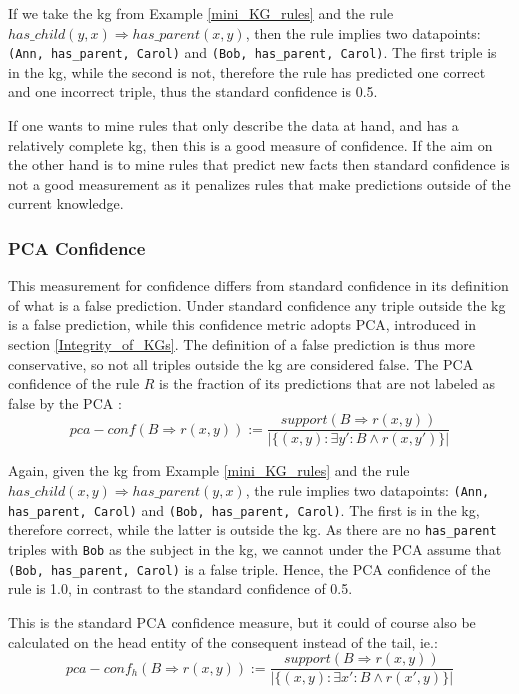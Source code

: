 If we take the \gls{kg} from Example \ref{mini_KG_rules} and the rule $has\_child(y, x) \Rightarrow has\_parent(x, y)$, then the rule implies two datapoints: \texttt{(Ann, has\_parent, Carol)} and \texttt{(Bob, has\_parent, Carol)}. The first triple is in the \gls{kg}, while the second is not, therefore the rule has predicted one correct and one incorrect triple, thus the standard confidence is 0.5.


If one wants to mine rules that only describe the data at hand, and has a relatively complete \gls{kg}, then this is a good measure of confidence. If the aim on the other hand is to mine rules that predict new facts then standard confidence is not a good measurement as it penalizes rules that make predictions outside of the current knowledge.


\subsubsection{PCA Confidence}
This measurement for confidence differs from standard confidence in its definition of what is a false prediction. Under standard confidence any triple outside the \gls{kg} is a false prediction, while this confidence metric adopts PCA, introduced in section \ref{Integrity_of_KGs}. The definition of a false prediction is thus more conservative, so not all triples outside the \gls{kg} are considered false. The PCA confidence of the rule $R$ is the fraction of its predictions that are not labeled as false by the PCA \cite{amie}:
\[pca-conf(B\Rightarrow r(x, y)) := \frac{support(B\Rightarrow r(x, y))}{|\{(x, y):\exists y' : B \wedge r(x, y')\}|}\]

Again, given the \gls{kg} from Example \ref{mini_KG_rules} and the rule $has\_child(x, y) \Rightarrow has\_parent(y, x)$, the rule implies two datapoints: \texttt{(Ann, has\_parent, Carol)} and \texttt{(Bob, has\_parent, Carol)}. The first is in the \gls{kg}, therefore correct, while the latter is outside the \gls{kg}. As there are no \texttt{has\_parent} triples with \texttt{Bob} as the subject in the \gls{kg}, we cannot under the PCA assume that \texttt{(Bob, has\_parent, Carol)} is a false triple. Hence, the PCA confidence of the rule is 1.0, in contrast to the standard confidence of 0.5.

This is the standard PCA confidence measure, but it could of course also be calculated on the head entity of the consequent instead of the tail, ie.: 
\[pca-conf_h(B\Rightarrow r(x, y)) := \frac{support(B\Rightarrow r(x, y))}{|\{(x, y):\exists x' : B \wedge r(x', y)\}|}\]

